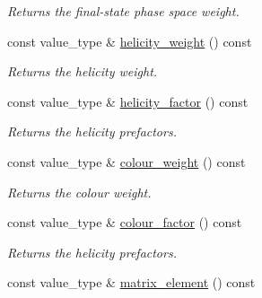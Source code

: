 \begin{DoxyCompactItemize}
\begin{DoxyCompactList}\small\item\em Returns the final-\/state phase space weight. \end{DoxyCompactList}\item 
\hypertarget{a00436_aca631af91752a7bdd6ead030c0b01c18}{}const value\+\_\+type \& \hyperlink{a00436_aca631af91752a7bdd6ead030c0b01c18}{helicity\+\_\+weight} () const \label{a00436_aca631af91752a7bdd6ead030c0b01c18}

\begin{DoxyCompactList}\small\item\em Returns the helicity weight. \end{DoxyCompactList}\item 
\hypertarget{a00436_a37f4d692d648bf3a752363d99693a070}{}const value\+\_\+type \& \hyperlink{a00436_a37f4d692d648bf3a752363d99693a070}{helicity\+\_\+factor} () const \label{a00436_a37f4d692d648bf3a752363d99693a070}

\begin{DoxyCompactList}\small\item\em Returns the helicity prefactors. \end{DoxyCompactList}\item 
\hypertarget{a00436_a183f62b32bdf1a26893679cf5a6e08e5}{}const value\+\_\+type \& \hyperlink{a00436_a183f62b32bdf1a26893679cf5a6e08e5}{colour\+\_\+weight} () const \label{a00436_a183f62b32bdf1a26893679cf5a6e08e5}

\begin{DoxyCompactList}\small\item\em Returns the colour weight. \end{DoxyCompactList}\item 
\hypertarget{a00436_a2ea429e4ea0150b714ce3400cdd0ef7c}{}const value\+\_\+type \& \hyperlink{a00436_a2ea429e4ea0150b714ce3400cdd0ef7c}{colour\+\_\+factor} () const \label{a00436_a2ea429e4ea0150b714ce3400cdd0ef7c}

\begin{DoxyCompactList}\small\item\em Returns the helicity prefactors. \end{DoxyCompactList}\item 
\hypertarget{a00436_a65efe3877d8bd7d3063595edbeb377d0}{}const value\+\_\+type \& \hyperlink{a00436_a65efe3877d8bd7d3063595edbeb377d0}{matrix\+\_\+element} () const \label{a00436_a65efe3877d8bd7d3063595edbeb377d0}


\end{DoxyCompactItemize}
